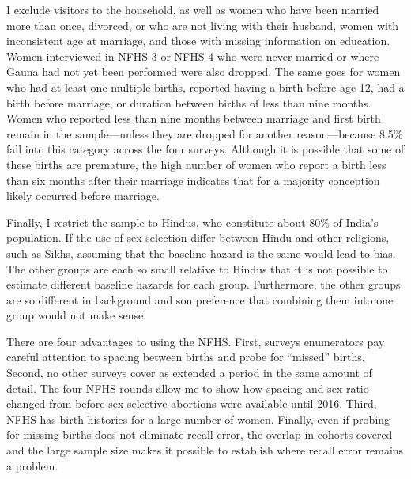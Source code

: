 \documentclass[12pt,letterpaper]{article}
\begin{document}
I exclude visitors to the household, as well as
women who have been married more than once, divorced, or who are 
not living with their husband,
women with inconsistent age at marriage,
and those with missing information on education.
Women interviewed in NFHS-3 or NFHS-4 who were never married or where Gauna 
had not yet been performed were also dropped.
The same goes for women who had at least one multiple births,
reported having a birth before age 12, had a birth before marriage, or
duration between births of less than nine months.
Women who reported less than nine months between marriage and first birth
remain in the sample---unless they are dropped for another reason---because 
8.5\% fall into this category across the four surveys.
Although it is possible that some of these births are premature, the high number of
women who report a birth less than six months after their marriage indicates that for
a majority conception likely occurred before marriage.

Finally, I restrict the sample to Hindus,
who constitute about 80\% of India's population.
If the use of sex selection differ between Hindu and other religions, such 
as Sikhs, assuming that the baseline hazard is the same would lead to bias.
The other groups are each so small relative to Hindus that it is not
possible to estimate different baseline hazards for each group.
Furthermore, the other groups are so different in background and son 
preference that combining them into one group would not make sense.

There are four advantages to using the NFHS.
First, surveys enumerators pay careful attention to spacing between births and
probe for ``missed'' births.
Second, no other surveys cover as extended a period in the same amount of detail.
The four NFHS rounds allow me to show how spacing and 
sex ratio changed from before sex-selective abortions were available until 2016.
Third, NFHS has birth histories for a large number of women.
Finally, even if probing for missing births does not eliminate recall error,   
the overlap in cohorts covered and the large sample size makes it possible 
to establish where recall error remains a problem.
\end{document}
